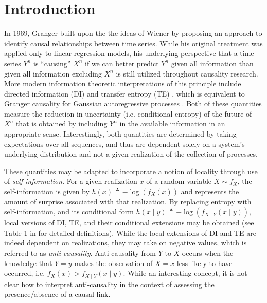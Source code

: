 \section{Introduction}

\begin{comment}
- Granger Causality
- Directed Information
- Transfer Entropy
- Local Transfer Entropy
- Sequential Prediction
- Argument for why sample path causality is important. Perhaps a neuroscientific argument that even if the model is time invariant, there may be certain patterns that induce a greater level of causal influence.
\end{itemize}}
\end{comment}

In 1969, Granger \cite{granger1969investigating} built upon the the ideas of Wiener by proposing an approach to identify causal relationships between time series. While his original treatment was applied only to linear regression models, his underlying perspective that a time series $Y^n$ is ``causing'' $X^n$ if we can better predict $Y^n$ given all information than given all information excluding $X^n$ is still utilized throughout causality research. More modern information theoretic interpretations of this principle include directed information (DI) \cite{marko1973bidirectional,massey1990causality} and transfer entropy (TE) \cite{schreiber2000measuring}, which is equivalent to Granger causality for Gaussian autoregressive processes \cite{barnett2009granger}. Both of these quantities measure the reduction in uncertainty (i.e. conditional entropy) of the future of $X^n$ that is obtained by including $Y^n$ in the available information in an appropriate sense. Interestingly, both quantities are determined by taking expectations over all sequences, and thus are dependent solely on a system's underlying distribution and not a given realization of the collection of processes.

These quantities may be adapted to incorporate a notion of locality through use of \emph{self-information}. For a given realization $x$ of a random variable $X\sim f_X$, the self-information is given by $h(x) \triangleq -\log(f_X(x))$ and represents the amount of surprise associated with that realization. By replacing entropy with self-information, and its conditional form $h(x\mid y) \triangleq -\log(f_{X\mid Y}(x\mid y))$, local versions of DI, TE, and their conditional extensions may be obtained (see Table 1 in \cite{lizier2014jidt} for detailed definitions). While the local extensions of DI and TE are indeed dependent on realizations, they may take on negative values, which is referred to as \emph{anti-causality}. Anti-causality from $Y$ to $X$ occurs when the knowledge that $Y=y$ makes the observation of $X=x$ less likely to have occurred, i.e. $f_X(x) > f_{X\mid Y}(x\mid y)$. While an interesting concept, it is not clear how to interpret anti-causality in the context of assessing the presence/absence of a causal link.

